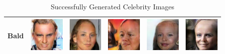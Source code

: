\begin{table}[ht]
\centering
\caption{Successfully Generated Celebrity Images}
\label{Celeb-a}
\begin{tabular}{|llllll|}
\hline
Bald & \includegraphics[width=1.69cm, height=1.69cm]{Files/images/images1/image100.png}  &\includegraphics[width=1.69cm, height=1.69cm]{Files/images/images1/image2.png}   & \includegraphics[width=1.69cm, height=1.69cm]{Files/images/images1/image3.png}  & \includegraphics[width=1.69cm, height=1.69cm]{Files/images/images1/image52.png}  & \includegraphics[width=1.69cm, height=1.69cm]{Files/images/images1/image68.png} \\ \hline



\end{tabular}
\end{table}

